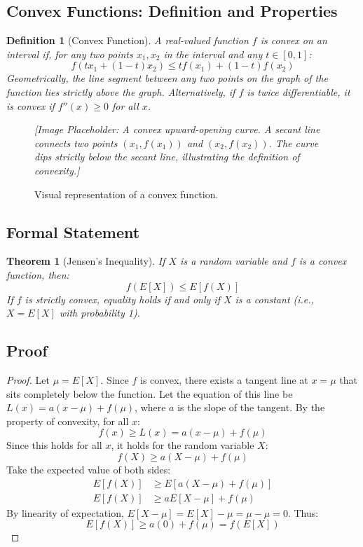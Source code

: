 \documentclass{article}
\newtheorem{theorem}{Theorem}
\newtheorem{definition}{Definition}
\begin{document}
\subsection{Convex Functions: Definition and Properties}
\begin{definition}[Convex Function]
A real-valued function $f$ is convex on an interval if, for any two points $x_1, x_2$ in the interval and any $t \in [0,1]$:
\[ f(tx_1 + (1-t)x_2) \le t f(x_1) + (1-t) f(x_2) \]
Geometrically, the line segment between any two points on the graph of the function lies strictly above the graph.
Alternatively, if $f$ is twice differentiable, it is convex if $f''(x) \ge 0$ for all $x$.
\end{definition}

\begin{figure}[h]
    \centering
    \textit{[Image Placeholder: A convex upward-opening curve. A secant line connects two points $(x_1, f(x_1))$ and $(x_2, f(x_2))$. The curve dips strictly below the secant line, illustrating the definition of convexity.]}
    \caption{Visual representation of a convex function.}
\end{figure}

\subsection{Formal Statement}
\begin{theorem}[Jensen's Inequality]
If $X$ is a random variable and $f$ is a convex function, then:
\[ f(E[X]) \le E[f(X)] \]
If $f$ is strictly convex, equality holds if and only if $X$ is a constant (i.e., $X = E[X]$ with probability 1).
\end{theorem}

\subsection{Proof}
\begin{proof}
Let $\mu = E[X]$. Since $f$ is convex, there exists a tangent line at $x = \mu$ that sits completely below the function. Let the equation of this line be $L(x) = a(x - \mu) + f(\mu)$, where $a$ is the slope of the tangent.
By the property of convexity, for all $x$:
\[ f(x) \ge L(x) = a(x - \mu) + f(\mu) \]
Since this holds for all $x$, it holds for the random variable $X$:
\[ f(X) \ge a(X - \mu) + f(\mu) \]
Take the expected value of both sides:
\begin{align*}
E[f(X)] &\ge E[a(X - \mu) + f(\mu)] \\
E[f(X)] &\ge a E[X - \mu] + f(\mu)
\end{align*}
By linearity of expectation, $E[X - \mu] = E[X] - \mu = \mu - \mu = 0$.
Thus:
\[ E[f(X)] \ge a(0) + f(\mu) = f(E[X]) \]
\end{proof}
\end{document}
